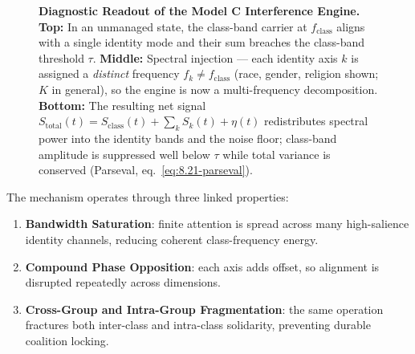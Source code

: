 \begin{figure}[htbp]
\caption{\textbf{Diagnostic Readout of the Model C Interference Engine.} \textbf{Top:} In an unmanaged state, the class-band carrier at $f_{\text{class}}$ aligns with a single identity mode and their sum breaches the class-band threshold $\tau$. \textbf{Middle:} Spectral injection --- each identity axis $k$ is assigned a \emph{distinct} frequency $f_k \ne f_{\text{class}}$ (race, gender, religion shown; $K$ in general), so the engine is now a multi-frequency decomposition. \textbf{Bottom:} The resulting net signal $S_{\text{total}}(t) = S_{\text{class}}(t) + \sum_k S_k(t) + \eta(t)$ redistributes spectral power into the identity bands and the noise floor; class-band amplitude is suppressed well below $\tau$ while total variance is conserved (Parseval, eq.~\ref{eq:8.21-parseval}).}
\label{fig:fractal-oscilloscope}
\end{figure}

The mechanism operates through three linked properties:
\begin{enumerate}
    \item \textbf{Bandwidth Saturation}: finite attention is spread across many high-salience identity channels, reducing coherent class-frequency energy.
    \item \textbf{Compound Phase Opposition}: each axis adds offset, so alignment is disrupted repeatedly across dimensions.
    \item \textbf{Cross-Group and Intra-Group Fragmentation}: the same operation fractures both inter-class and intra-class solidarity, preventing durable coalition locking.
\end{enumerate}

